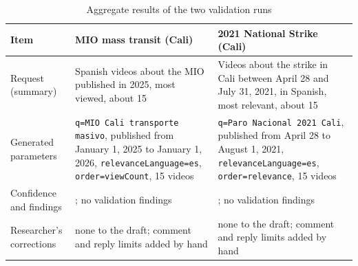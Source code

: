 \begingroup
{}
\begin{table}[htbp]
    \centering
    \footnotesize
    \caption{Aggregate results of the two validation runs}
    \label{tab:validation_results}
    \begin{tabularx}
        {\textwidth}{>{\raggedright\arraybackslash}p{3.6cm}>{\raggedright\arraybackslash}X>{\raggedright\arraybackslash}X}
        \toprule
        \textbf{Item}                                                   & \textbf{MIO mass transit (Cali)}                                                                                                                                   & \textbf{2021 National Strike (Cali)}                                                                                                                               \\
        \midrule
        Request (summary)                                               & Spanish videos about the MIO published in 2025, most viewed, about 15                                                                                              & Videos about the strike in Cali between April 28 and July 31, 2021, in Spanish, most relevant, about 15                                                            \\
        \midrule
        Generated parameters                                            & \texttt{q=MIO Cali transporte masivo}, published from January 1, 2025 to January 1, 2026, \texttt{relevanceLanguage=es}, \texttt{order=viewCount}, 15 videos       & \texttt{q=Paro Nacional 2021 Cali}, published from April 28 to August 1, 2021, \texttt{relevanceLanguage=es}, \texttt{order=relevance}, 15 videos                  \\
        \midrule
        Confidence and findings                                         & 0.99; no validation findings                                                                                                                                       & 0.99; no validation findings                                                                                                                                       \\
        \midrule
        Researcher's corrections                                        & none to the draft; comment and reply limits added by hand                                                                                                          & none to the draft; comment and reply limits added by hand                                                                                                          \\

\end{tabularx}
\end{table}
